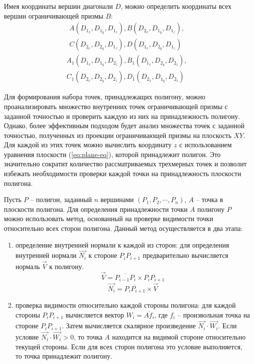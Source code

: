 Имея координаты вершин диагонали $D$, можно определить координаты всех вершин ограничивающей призмы $B$:
\begin{equation}
	\begin{aligned}
		A(D_{1_x}, D_{1_y}, D_{1_z}),
		B(D_{2_x}, D_{1_y}, D_{1_z}), \\
		C(D_{2_x}, D_{2_y}, D_{1_z}),
		D(D_{1_x}, D_{2_y}, D_{1_z})
	\end{aligned}
\end{equation}
\begin{equation}
	\begin{aligned}
		A_1(D_{1_x}, D_{1_y}, D_{2_z}),
		B_1(D_{1_x}, D_{2_y}, D_{2_z}), \\
		C_1(D_{2_x}, D_{2_y}, D_{2_z}), 
		D_1(D_{2_x}, D_{1_y}, D_{2_z}) 
	\end{aligned}
\end{equation}

Для формирования набора точек, принадлежащих полигону, можно проанализировать множество внутренних точек ограничивающей призмы с заданной точностью и проверить каждую из них на принадлежность полигону. Однако, более эффективным подходом будет анализ множества точек с заданной точностью, полученных из проекции ограничивающей призмы на плоскость $XY$. Для каждой из этих точек можно вычислить координату $z$ с использованием уравнения плоскости (\ref{eq:plane-eq}), которой принадлежит полигон. Это значительно сократит количество рассматриваемых трехмерных точек и позволит избежать необходимости проверки каждой точки на принадлежность плоскости полигона.

Пусть $P$ -- полигон, заданный $n$ вершинами $(P_1, P_2, \cdots, P_n)$, $A$ -- точка в плоскости полигона. Для определения принадлежности точки $A$ полигону $P$ можно использовать метод, основанный на проверке видимости точки относительно всех сторон полигона. Данный метод осуществляется в два этапа:
\begin{enumerate}
	\item определение внутренней нормали к каждой из сторон: для определения внутренней нормали $\vec{N_i}$ к стороне $P_iP_{i+1}$ предварительно вычисляется нормаль $\vec{V}$ к полигону.
	\begin{equation}
		\vec{V} = \overline{P_{i-1}P_{i}} \times \overline{P_{i}P_{i+1}}
	\end{equation}
	\begin{equation}
		\vec{N_i} = \overline{P_iP_{i+1}} \times \vec{V}
	\end{equation}
	
	\item проверка видимости относительно каждой стороны полигона: для каждой стороны $P_iP_{i+1}$ вычисляется вектор $W_i = \overline{Af_i}$, где $f_i$ -- произвольная точка на стороне $P_iP_{i+1}$. Затем вычисляется скалярное произведение $\vec{N_i} \cdot \vec{W_i}$. Если условие $\vec{N_i} \cdot \vec{W_i} > 0$, то точка $A$ находится на видимой стороне относительно текущей стороны. Если для всех сторон полигона это условие выполняется, то точка принадлежит полигону.
\end{enumerate}

